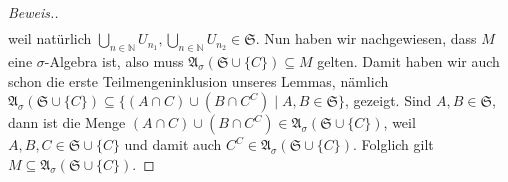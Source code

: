 \begin{proof}[Beweis.]
\begin{align*}
    \end{align*}
    weil natürlich $\bigcup_{n\in\mathbb{N}}U_{n_1}, \bigcup_{n\in\mathbb{N}}U_{n_2}\in\mathfrak{S}$. Nun haben wir nachgewiesen, dass $M$ eine $\sigma$-Algebra ist, also muss $\mathfrak{A}_\sigma(\mathfrak{S}\cup\{C\})\subseteq M$ gelten. Damit haben wir auch schon die erste Teilmengeninklusion unseres Lemmas, nämlich $\mathfrak{A}_\sigma(\mathfrak{S}\cup\{C\})\subseteq\{(A\cap C)\cup(B \cap C^C)\mid A,B \in \mathfrak{S}\}$, gezeigt. \newline
    Sind $A,B\in\mathfrak{S}$, dann ist die Menge $(A\cap C)\cup(B \cap C^C)\in\mathfrak{A}_\sigma(\mathfrak{S}\cup\{C\})$, weil $A,B,C\in\mathfrak{S}\cup\{C\}$ und damit auch $C^C\in\mathfrak{A}_\sigma(\mathfrak{S}\cup\{C\})$. Folglich gilt $M\subseteq\mathfrak{A}_\sigma(\mathfrak{S}\cup\{C\})$.
\end{proof}